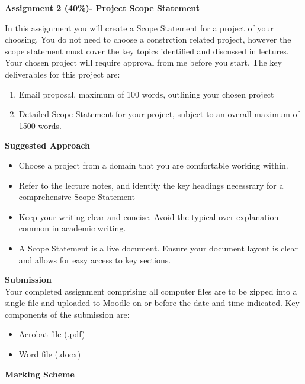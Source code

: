 
	
\begin{flushleft}
\Large\textbf{Assignment 2 (40\%)- Project Scope Statement}\\
\end{flushleft}

In this assignment you will create a Scope Statement for a project of your choosing.  You do not need to choose a constrction related project, however the scope statement must cover the key topics identified and discussed in lectures.  Your chosen project will require approval from me before you start.  The key deliverables for this project are:

\begin{enumerate}
	\item Email proposal, maximum of 100 words, outlining your chosen project
	\item Detailed Scope Statement for your project, subject to an overall maximum of 1500 words.
\end{enumerate}


\textbf{Suggested Approach}

\begin{itemize}
	\item Choose a project from a domain that you are comfortable working within.  
	\item Refer to the lecture notes, and identity the key headings necessrary for a comprehensive Scope Statement
	\item Keep your writing clear and concise.  Avoid the typical over-explanation common in academic writing.
	\item A Scope Statement is a live document.  Ensure your document layout is clear and allows for easy access to key sections. 

\end{itemize}


\textbf{Submission}\\
Your completed assignment comprising all computer files are to be zipped into a single file and uploaded to Moodle on or before the date and time indicated.  Key components of the submission are:
\begin{itemize}
	\item Acrobat file (.pdf)
	\item Word file (.docx)
\end{itemize}



\textbf{Marking Scheme}

